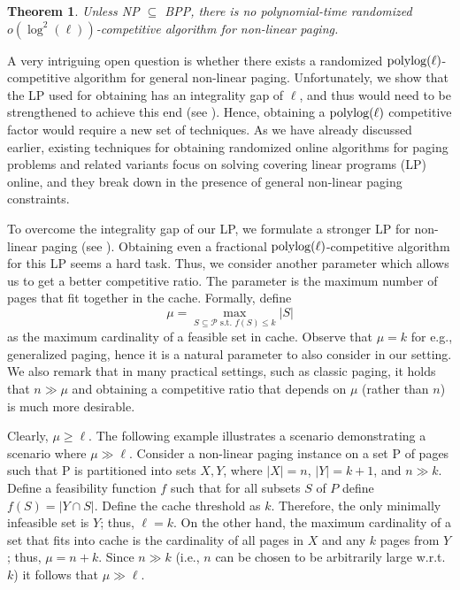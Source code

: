\documentclass[11pt]{article}
\newcommand{\cP}{{\mathcal{P}}}
\newtheorem{theorem}[thm]{Theorem}
\begin{document}
\begin{theorem}
	\label{thm:LB}
Unless \textnormal{NP $\subseteq $ BPP}, there is no polynomial-time randomized $o(\log^2 (\ell))$-competitive algorithm for \textnormal{non-linear paging}.
\end{theorem}


A very intriguing open question is whether there exists a randomized $\textnormal{polylog} (\ell)$-competitive algorithm for general non-linear paging. Unfortunately, we show that the LP used for obtaining  has an integrality gap of $\ell$, and thus would need to be strengthened to achieve this end (see ).  Hence, obtaining a $\textnormal{polylog} (\ell)$ competitive factor would require a new set of techniques. As we have already discussed earlier, existing techniques for obtaining randomized online algorithms for paging problems and related variants focus on solving covering linear programs (LP) online, and they break down in the presence of general non-linear paging constraints. 

To overcome the integrality gap of our LP, we formulate a stronger LP for non-linear paging (see ). Obtaining even a fractional $\textnormal{polylog}(\ell)$-competitive algorithm for this LP seems a hard task. Thus, we consider another parameter which allows us to get a better competitive ratio. The parameter is the maximum number of pages that fit together in the cache. Formally, define 
\begin{equation}
	\label{eq:mu}
	\mu = \max_{S \subseteq \cP \text{ s.t. } f(S) \leq k} |S|
\end{equation} as the maximum cardinality of a feasible set in cache. Observe that $\mu = k$ for e.g., generalized paging, hence it is a natural parameter to also consider in our setting. We also remark that in many practical settings, such as classic paging, it holds that $n \gg \mu$ and obtaining a competitive ratio that depends on $\mu$ (rather than $n$) is much more desirable. 

Clearly, $\mu \geq \ell$. The following example illustrates a scenario demonstrating a scenario where $\mu \gg \ell$. Consider a non-linear paging
instance on a set P of pages such that P is partitioned into sets $X,Y$, where $|X| = n$, $|Y| = k+1$, and $n \gg k$.
Define a feasibility function $f$ such that for all subsets $S$ of $P$ define $f(S) = |Y \cap S|$. Define the cache
threshold as $k$. Therefore, the only minimally infeasible set is $Y$; thus, $\ell = k$. On the other hand, the
maximum cardinality of a set that fits into cache is the cardinality of all pages in $X$ and any $k$ pages from
$Y$; thus, $\mu = n+k$. Since $n \gg k$ (i.e., $n$ can be chosen to be arbitrarily large w.r.t. $k$) it follows that $\mu \gg \ell$. 
\end{document}

